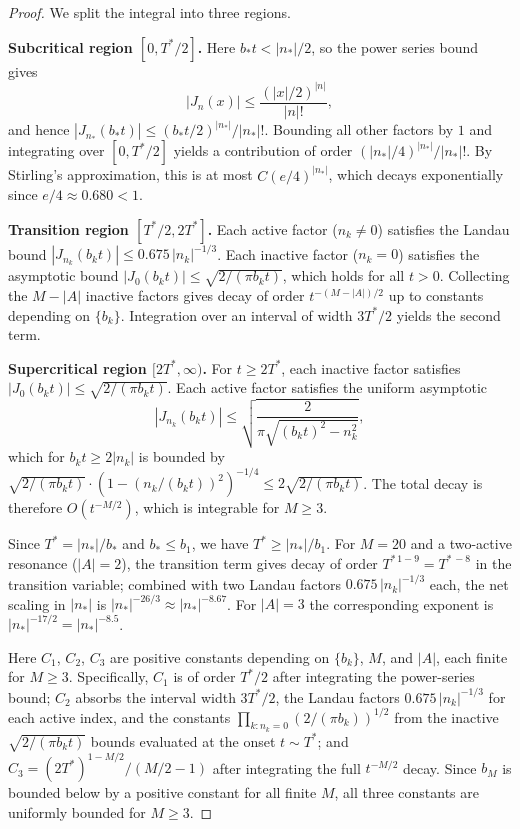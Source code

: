 \documentclass[12pt,reqno]{amsart}
\theoremstyle{plain}
\theoremstyle{definition}
\theoremstyle{remark}
\begin{document}
\begin{proof}
We split the integral into three regions.

\textbf{Subcritical region $[0, T^*/2]$.}  Here $b_* t < |n_*|/2$, so the power series bound gives
\[
  |J_n(x)| \leq \frac{(|x|/2)^{|n|}}{|n|!},
\]
and hence $|J_{n_*}(b_* t)| \leq (b_* t/2)^{|n_*|}/|n_*|!$.
Bounding all other factors by $1$ and integrating over $[0, T^*/2]$ yields a contribution of order $(|n_*|/4)^{|n_*|}/|n_*|!$.  By Stirling's approximation, this is at most $C(e/4)^{|n_*|}$, which decays exponentially since $e/4 \approx 0.680 < 1$.

\textbf{Transition region $[T^*/2, 2T^*]$.}  Each active factor ($n_k \neq 0$) satisfies the Landau bound $|J_{n_k}(b_k t)| \leq 0.675\,|n_k|^{-1/3}$.  Each inactive factor ($n_k = 0$) satisfies the asymptotic bound $|J_0(b_k t)| \leq \sqrt{2/(\pi b_k t)}$, which holds for all $t > 0$.  Collecting the $M - |A|$ inactive factors gives decay of order $t^{-(M-|A|)/2}$ up to constants depending on $\{b_k\}$.  Integration over an interval of width $3T^*/2$ yields the second term.

\textbf{Supercritical region $[2T^*, \infty)$.}  For $t \geq 2T^*$, each inactive factor satisfies $|J_0(b_k t)| \leq \sqrt{2/(\pi b_k t)}$.  Each active factor satisfies the uniform asymptotic
\[
  |J_{n_k}(b_k t)| \leq \sqrt{\frac{2}{\pi\sqrt{(b_k t)^2 - n_k^2}}},
\]
which for $b_k t \geq 2|n_k|$ is bounded by $\sqrt{2/(\pi b_k t)} \cdot (1 - (n_k/(b_k t))^2)^{-1/4} \leq 2\sqrt{2/(\pi b_k t)}$.  The total decay is therefore $O(t^{-M/2})$, which is integrable for $M \geq 3$.

Since $T^* = |n_*|/b_*$ and $b_* \leq b_1$, we have $T^* \geq |n_*|/b_1$.  For $M = 20$ and a two-active resonance ($|A| = 2$), the transition term gives decay of order $T^{*\,1-9} = T^{*\,-8}$ in the transition variable; combined with two Landau factors $0.675\,|n_k|^{-1/3}$ each, the net scaling in $|n_*|$ is $|n_*|^{-26/3} \approx |n_*|^{-8.67}$.  For $|A| = 3$ the corresponding exponent is $|n_*|^{-17/2} = |n_*|^{-8.5}$.

Here $C_1$, $C_2$, $C_3$ are positive constants depending on $\{b_k\}$, $M$, and $|A|$, each finite for $M \geq 3$.  Specifically, $C_1$ is of order $T^*/2$ after integrating the power-series bound; $C_2$ absorbs the interval width $3T^*/2$, the Landau factors $0.675\,|n_k|^{-1/3}$ for each active index, and the constants $\prod_{k\colon n_k=0}(2/(\pi b_k))^{1/2}$ from the inactive $\sqrt{2/(\pi b_k t)}$ bounds evaluated at the onset $t \sim T^*$; and $C_3 = (2T^*)^{1-M/2}/(M/2-1)$ after integrating the full $t^{-M/2}$ decay.  Since $b_M$ is bounded below by a positive constant for all finite $M$, all three constants are uniformly bounded for $M \geq 3$.
\end{proof}
\end{document}
